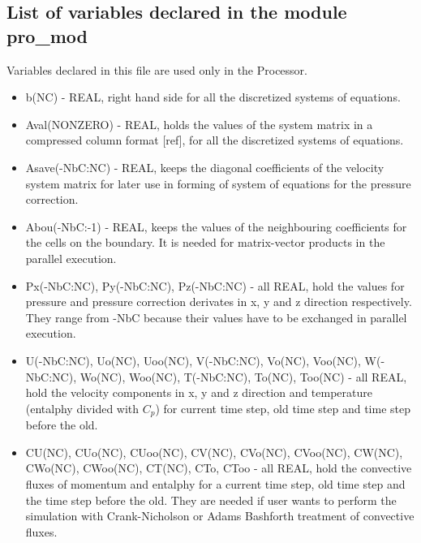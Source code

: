 \documentclass[10pt]{article}
\newcommand*{\tc}{\ttfamily} %
\begin{document}
    \subsection{List of variables declared in the module {\tc pro\_mod}}

    Variables declared in this file are used only in the Processor.

    \begin{itemize}

    \item
    {\tc b(NC)} - REAL, right hand side for all the discretized systems
      of equations.

    \item
    {\tc Aval(NONZERO)} - REAL, holds the values of the system matrix
      in a compressed column format [ref], for all the discretized
      systems of equations.

    \item
    {\tc Asave(-NbC:NC)} - REAL, keeps the diagonal coefficients of the
      velocity system matrix for later use in forming of system of
      equations for the pressure correction.

    \item
    {\tc Abou(-NbC:-1)} - REAL, keeps the values of the neighbouring
      coefficients for the cells on the boundary. It is needed for
      matrix-vector products in the parallel execution.

    \item
    {\tc Px(-NbC:NC)}, {\tc Py(-NbC:NC)}, {\tc Pz(-NbC:NC)} 
      - all REAL, hold the values for pressure and pressure correction
      derivates in x, y and z direction respectively. They range
      from {\tc -NbC} because their values have to be exchanged in
      parallel execution.

    \item
    {\tc U(-NbC:NC)}, {\tc Uo(NC)}, {\tc Uoo(NC)}, 
    {\tc V(-NbC:NC)}, {\tc Vo(NC)}, {\tc Voo(NC)},
    {\tc W(-NbC:NC)}, {\tc Wo(NC)}, {\tc Woo(NC)},  
    {\tc T(-NbC:NC)}, {\tc To(NC)}, {\tc Too(NC)} - all REAL,  
      hold the velocity components in x, y and z direction and
      temperature (entalphy divided with $C_p$) for current
      time step, old time step and time step before the old. 

    \item
    {\tc CU(NC)}, {\tc CUo(NC)}, {\tc CUoo(NC)}, {\tc CV(NC)}, 
    {\tc CVo(NC)}, {\tc CVoo(NC)}, {\tc CW(NC)}, {\tc CWo(NC)}, 
    {\tc CWoo(NC)}, {\tc CT(NC)}, {\tc CTo}, {\tc CToo} - all REAL, 
      hold the convective
      fluxes of momentum and entalphy for a current time step, old time step
      and the time step before the old. They are needed if user
      wants to perform the simulation with Crank-Nicholson or
      Adams Bashforth treatment of convective fluxes.


\end{itemize}
\end{document}
